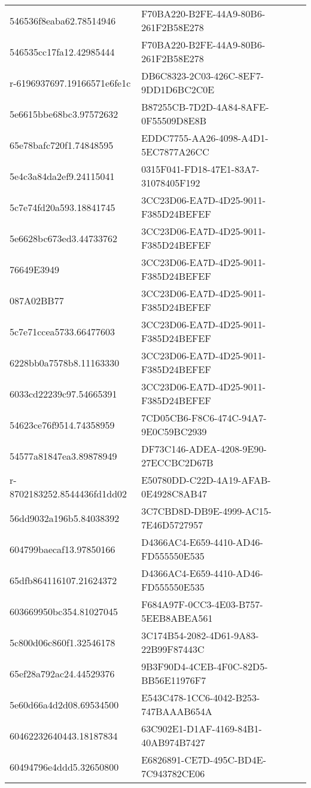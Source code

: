 \begin{tabular}{ll}
546536f8eaba62.78514946 & F70BA220-B2FE-44A9-80B6-261F2B58E278 \\
546535cc17fa12.42985444 & F70BA220-B2FE-44A9-80B6-261F2B58E278 \\
r-6196937697.19166571e6fe1c & DB6C8323-2C03-426C-8EF7-9DD1D6BC2C0E \\
5e6615bbe68bc3.97572632 & B87255CB-7D2D-4A84-8AFE-0F55509D8E8B \\
65e78bafc720f1.74848595 & EDDC7755-AA26-4098-A4D1-5EC7877A26CC \\
5e4c3a84da2ef9.24115041 & 0315F041-FD18-47E1-83A7-31078405F192 \\
5c7e74fd20a593.18841745 & 3CC23D06-EA7D-4D25-9011-F385D24BEFEF \\
5e6628bc673ed3.44733762 & 3CC23D06-EA7D-4D25-9011-F385D24BEFEF \\
76649E3949 & 3CC23D06-EA7D-4D25-9011-F385D24BEFEF \\
087A02BB77 & 3CC23D06-EA7D-4D25-9011-F385D24BEFEF \\
5c7e71ccea5733.66477603 & 3CC23D06-EA7D-4D25-9011-F385D24BEFEF \\
6228bb0a7578b8.11163330 & 3CC23D06-EA7D-4D25-9011-F385D24BEFEF \\
6033cd22239c97.54665391 & 3CC23D06-EA7D-4D25-9011-F385D24BEFEF \\
54623ce76f9514.74358959 & 7CD05CB6-F8C6-474C-94A7-9E0C59BC2939 \\
54577a81847ea3.89878949 & DF73C146-ADEA-4208-9E90-27ECCBC2D67B \\
r-8702183252.8544436fd1dd02 & E50780DD-C22D-4A19-AFAB-0E4928C8AB47 \\
56dd9032a196b5.84038392 & 3C7CBD8D-DB9E-4999-AC15-7E46D5727957 \\
604799baecaf13.97850166 & D4366AC4-E659-4410-AD46-FD555550E535 \\
65dfb864116107.21624372 & D4366AC4-E659-4410-AD46-FD555550E535 \\
603669950bc354.81027045 & F684A97F-0CC3-4E03-B757-5EEB8ABEA561 \\
5c800d06c860f1.32546178 & 3C174B54-2082-4D61-9A83-22B99F87443C \\
65ef28a792ac24.44529376 & 9B3F90D4-4CEB-4F0C-82D5-BB56E11976F7 \\
5e60d66a4d2d08.69534500 & E543C478-1CC6-4042-B253-747BAAAB654A \\
60462232640443.18187834 & 63C902E1-D1AF-4169-84B1-40AB974B7427 \\
60494796e4ddd5.32650800 & E6826891-CE7D-495C-BD4E-7C943782CE06 \\

\end{tabular}
